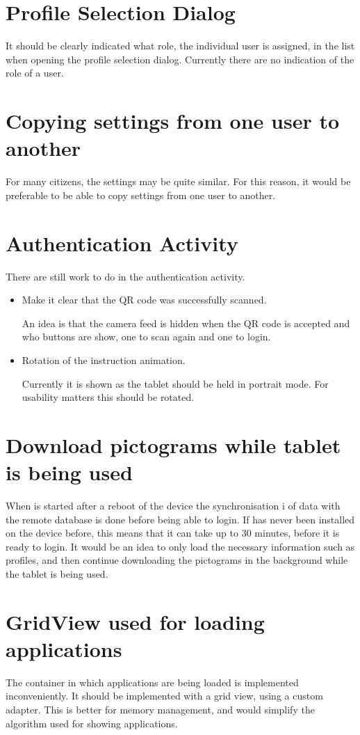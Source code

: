 \section{Profile Selection Dialog}
It should be clearly indicated what role, the individual user is assigned, in the list when opening the profile selection dialog.
Currently there are no indication of the role of a user.

\section{Copying settings from one user to another}
For many citizens, the settings may be quite similar.
For this reason, it would be preferable to be able to copy settings from one user to another.

\section{Authentication Activity}
There are still work to do in the authentication activity.

\begin{itemize}
	\item Make it clear that the QR code was successfully scanned.

	An idea is that the camera feed is hidden when the QR code is accepted and who buttons are show, one to scan again and one to login.
	\item Rotation of the instruction animation.

	Currently it is shown as the tablet should be held in portrait mode. For usability matters this should be rotated. %
\end{itemize}

\section{Download pictograms while tablet is being used}
When \launcher is started after a reboot of the device the synchronisation i of data with the remote database is done before being able to login.
If \launcher has never been installed on the device before, this means that it can take up to 30 minutes, before it is ready to login.
It would be an idea to only load the necessary information such as profiles, and then continue downloading the pictograms in the background while the tablet is being used.

\section{GridView used for loading applications}
The container in which applications are being loaded is implemented inconveniently. It should be implemented with a grid view, using a custom adapter. This is better for memory management, and would simplify the algorithm used for showing applications. 